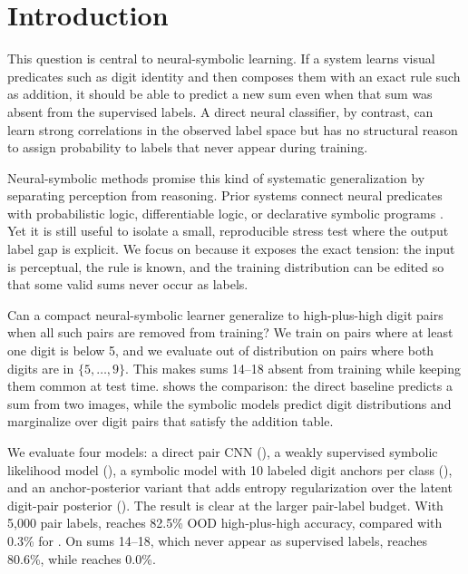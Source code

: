 \section{Introduction}
\label{sec:introduction}

 This question is central to neural-symbolic learning. If a system learns visual predicates such as digit identity and then composes them with an exact rule such as addition, it should be able to predict a new sum even when that sum was absent from the supervised labels. A direct neural classifier, by contrast, can learn strong correlations in the observed label space but has no structural reason to assign probability to labels that never appear during training.

Neural-symbolic methods promise this kind of systematic generalization by separating perception from reasoning. Prior systems connect neural predicates with probabilistic logic, differentiable logic, or declarative symbolic programs \cite{manhaeve2018deepproblog,vankrieken2022anesi,li2023scallop,badreddine2022logic}. Yet it is still useful to isolate a small, reproducible stress test where the output label gap is explicit. We focus on \addmnist because it exposes the exact tension: the input is perceptual, the rule is known, and the training distribution can be edited so that some valid sums never occur as labels.



 Can a compact neural-symbolic \addmnist learner generalize to high-plus-high digit pairs when all such pairs are removed from training? We train on pairs where at least one digit is below 5, and we evaluate out of distribution on pairs where both digits are in $\{5,\ldots,9\}$. This makes sums 14--18 absent from training while keeping them common at test time.  shows the comparison: the direct baseline predicts a sum from two images, while the symbolic models predict digit distributions and marginalize over digit pairs that satisfy the addition table.

We evaluate four models: a direct pair CNN (\directsum), a weakly supervised symbolic likelihood model (\symbolicsum), a symbolic model with 10 labeled digit anchors per class (\anchorsymbolic), and an anchor-posterior variant that adds entropy regularization over the latent digit-pair posterior (\anchorposterior). The result is clear at the larger pair-label budget. With 5,000 pair labels, \symbolicsum reaches 82.5\% OOD high-plus-high accuracy, compared with 0.3\% for \directsum. On sums 14--18, which never appear as supervised labels, \symbolicsum reaches 80.6\%, while \directsum reaches 0.0\%.

